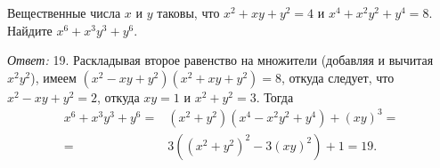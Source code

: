 Вещественные числа $x$ и $y$ таковы, что
$x^2 + x y + y^2 = 4$ и $x^4 + x^2 y^2 + y^4 = 8$.
Найдите $x^6 + x^3 y^3 + y^6$.

\solution
\emph{Ответ:} 19.
Раскладывая второе равенство на множители (добавляя и вычитая $x^2 y^2$), имеем
$(x^2 - x y + y^2) (x^2 + x y + y^2) = 8$,
откуда следует, что $x^2  - x y + y^2 = 2$,
откуда $x y = 1$ и $x^2 + y^2 = 3$.
Тогда
\begin{align*}
    x^6 + x^3 y^3 + y^6
={}&
    (x^2 + y^2) (x^4 - x^2 y^2 + y^4) + (x y)^3
=\\={}&
    3((x^2 + y^2)^2 - 3 (x y)^2) + 1 = 19
.\end{align*}

